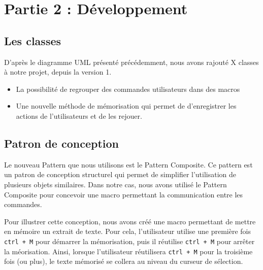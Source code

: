 \documentclass[a4paper, 12pt]{report}
\begin{document}
	\newpage
	
	\chapter*{Partie 2 : Développement}

		\section*{Les classes}

			D'après le diagramme UML présenté précédemment, nous avons rajouté X classes à notre projet, depuis la version 1.

		\begin{itemize}
			\item La possibilité de regrouper des commandes utilisateurs dans des macros

			\item Une nouvelle méthode de mémorisation qui permet de d'enregistrer les actions de l'utilisateurs et de les rejouer. 

		\end{itemize}

		\section*{Patron de conception}

		Le nouveau Pattern que nous utilisons est le Pattern Composite. Ce pattern est un patron de conception structurel qui permet de simplifier l'utilisation de plusieurs objets similaires. Dans notre cas, nous avons utilisé le Pattern Composite pour concevoir une macro permettant la communication entre les commandes. 

		\vspace{0.5cm}

		Pour illustrer cette conception, nous avons créé une macro permettant de mettre en mémoire un extrait de texte. Pour cela, l'utilisateur utilise une première fois \texttt{ctrl + M} pour démarrer la mémorisation, puis il réutilise \texttt{ctrl + M} pour arrêter la méorisation. Ainsi, lorsque l'utilisateur réutilisera \texttt{ctrl + M} pour la troisième fois (ou plus), le texte mémorisé se collera au niveau du curseur de sélection. 
\end{document}
